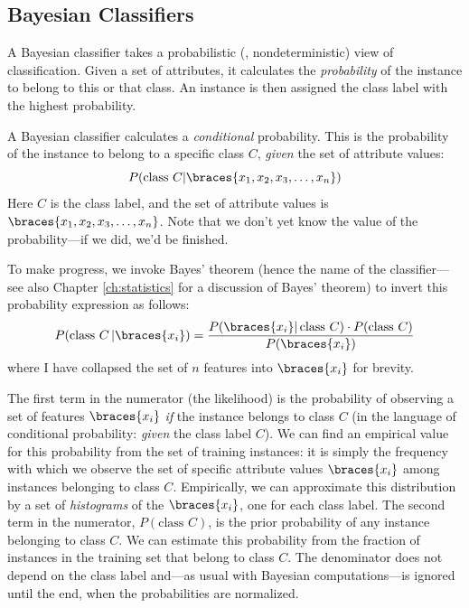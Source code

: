 \subsection{Bayesian Classifiers}


A Bayesian classifier takes a probabilistic (\ie,
nondeterministic) view of classification. Given a set of attributes,
it calculates the \emph{probability} of the instance to belong to
this or that class. An instance is then assigned the class label with
the highest probability.

A Bayesian classifier calculates a \emph{conditional} probability.
This is the probability of the instance to belong to a specific class
$C$, \emph{given} the set of attribute values:
%
\[
P( \text{class $C$} | \braces{x_1, x_2, x_3, \dots, x_n} )
\]
%
Here $C$ is the class label, and the set of attribute values is
$\braces{x_1, x_2, x_3, \dots, x_n}$. Note that we don't yet know the
value of the probability---if we did, we'd be finished.

To make progress, we invoke Bayes' theorem (hence the name of the
classifier---see also Chapter \ref{ch:statistics} for a discussion
of Bayes' theorem) to invert this probability expression as follows:
%
\[
P( \text{class $C$} \, | \braces{x_i} )
= \frac{ P( \braces{x_i} | \, \text{class $C$} ) 
         \cdot P( \text{class $C$} ) }
       { P( \braces{x_i} ) }
\]
%
where I have collapsed the set of $n$ features into $\braces{x_i}$ for
brevity.

The first term in the numerator (the likelihood) is the probability of
observing a set of features $\braces{x_i}$ \emph{if} the instance
belongs to class $C$ (in the language of conditional probability:
\emph{given} the class label $C$).  We can find an empirical value for
this probability from the set of training instances: it is simply the
frequency with which we observe the set of specific attribute values
$\braces{x_i}$ among instances belonging to class $C$. Empirically, we
can approximate this distribution by a set of \emph{histograms} of the
$\braces{x_i}$, one for each class label.  The second term in the
numerator, $P(\text{class $C$} )$, is the prior probability of any
instance belonging to class $C$. We can estimate this probability from
the fraction of instances in the training set that belong to class
$C$.  The denominator does not depend on the class label and---as
usual with Bayesian computations---is ignored until the end, when the
probabilities are normalized.

